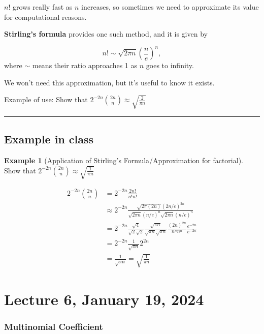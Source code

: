 \documentclass[
]{book}
\theoremstyle{definition}
\theoremstyle{definition}
\newtheorem{example}{Example}[chapter]
\theoremstyle{definition}
\theoremstyle{definition}
\theoremstyle{remark}
\begin{document}
\(n!\) grows really fast as \(n\) increases, so sometimes we need to approximate its value for computational reasons.

\textbf{Stirling's formula} provides one such method, and it is given by

\[
n! \sim \sqrt{2 \pi n} \left( \frac{n}{e} \right)^n,
\]
where \(\sim\) means their ratio approaches 1 as \(n\) goes to infinity.

We won't need this approximation, but it's useful to know it exists.

Example of use:
Show that \(2^{-2n}\binom{2n}{n} \approx \sqrt{\frac{2}{\pi n}}\)

\begin{center}\rule{0.5\linewidth}{0.5pt}\end{center}

\hypertarget{example-in-class}{%
\section{Example in class}\label{example-in-class}}

\begin{example}[Application of Stirling's Formula/Approximation for factorial]
Show that \(2^{-2n}{2n \choose n} \approx \sqrt{\frac{1}{\pi n}}\)

\begin{align*}
  2^{-2n}{2n \choose n} &= 2^{-2n}\frac{2n!}{n!n!} \\
  &\approx 2^{-2n} \frac{\sqrt{2\pi (2n)} (2n/e)^{2n}}{\sqrt{2\pi n} (n/e)^{n}\sqrt{2\pi n} (n/e)^{n}}\\
  &= 2^{-2n} \frac{\sqrt{4}}{\sqrt{2}\sqrt{2}} \frac{\sqrt{\pi n}}{\sqrt{\pi n}\sqrt{\pi n}} \frac{(2n)^{2n}}{n^n n^n} \frac{e^{-2n}}{e^{-2n}}\\
  &=  2^{-2n} \frac{1}{\sqrt{\pi n}} 2^{2n}\\
  &= \frac{1}{\sqrt{\pi n}} = \sqrt{\frac{1}{\pi n}}
\end{align*}
\end{example}

\hypertarget{lecture-6-january-19-2024}{%
\chapter{Lecture 6, January 19, 2024}\label{lecture-6-january-19-2024}}

\hypertarget{multinomial-coefficient}{%
\subsection{Multinomial Coefficient}\label{multinomial-coefficient}}
\end{document}

